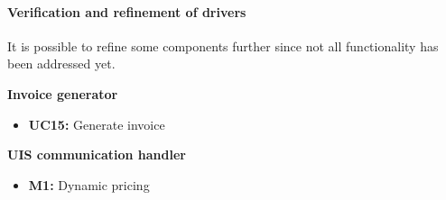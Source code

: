 \paragraph{Verification and refinement of drivers}
It is possible to refine some components further since not all functionality has been addressed yet.

\textbf{Invoice generator}
\begin{itemize}
	\item \textbf{UC15: } Generate invoice
\end{itemize}

\textbf{UIS communication handler}
\begin{itemize}
	\item \textbf{M1: } Dynamic pricing
\end{itemize}
